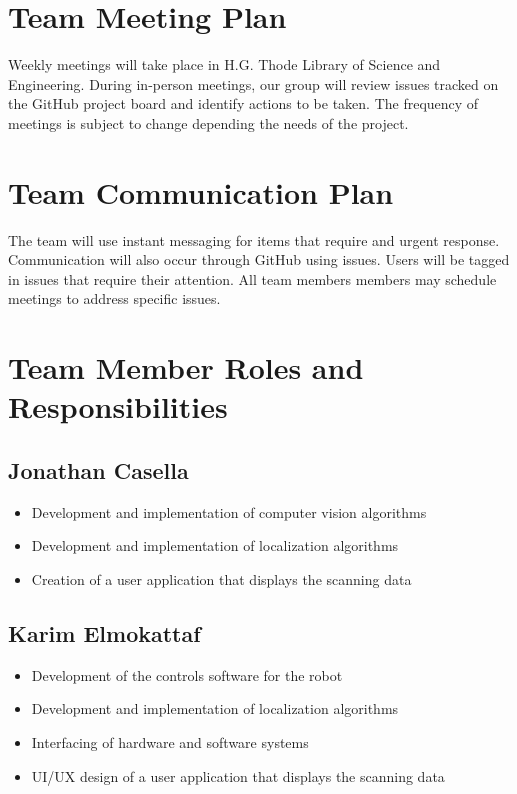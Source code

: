 \documentclass[titlepage]{article}
\begin{document}
\section{Team Meeting Plan}

Weekly meetings will take place in H.G. Thode Library of Science and Engineering. During in-person meetings, our group will review issues tracked on the GitHub project board and identify actions to be taken. The frequency of meetings is subject to change depending the needs of the project. 

\section{Team Communication Plan}

The team will use instant messaging for items that require and urgent response. Communication will also occur through GitHub using issues. Users will be tagged in issues that require their attention. All team members members may schedule  meetings to address specific issues. 

\section{Team Member Roles and Responsibilities}

\subsection{Jonathan Casella}
\begin{itemize}
\item Development and implementation of computer vision algorithms
\item Development and implementation of localization algorithms
\item Creation of a user application that displays the scanning data
\end{itemize}

\subsection{Karim Elmokattaf}
\begin{itemize}
\item Development of the controls software for the robot
\item Development and implementation of localization algorithms
\item Interfacing of hardware and software systems
\item UI/UX design of a user application that displays the scanning data
\end{itemize}
\end{document}
